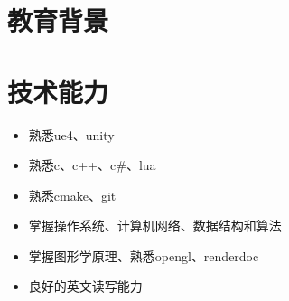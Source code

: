 \documentclass{resume}
\begin{document}



\section{教育背景}

\section{技术能力}
\begin{itemize}[parsep=0.2ex]
  \item 熟悉ue4、unity
  \item 熟悉c、c++、c\#、lua
  \item 熟悉cmake、git
  \item 掌握操作系统、计算机网络、数据结构和算法
  \item 掌握图形学原理、熟悉opengl、renderdoc
  \item 良好的英文读写能力
\end{itemize}

\end{document}
